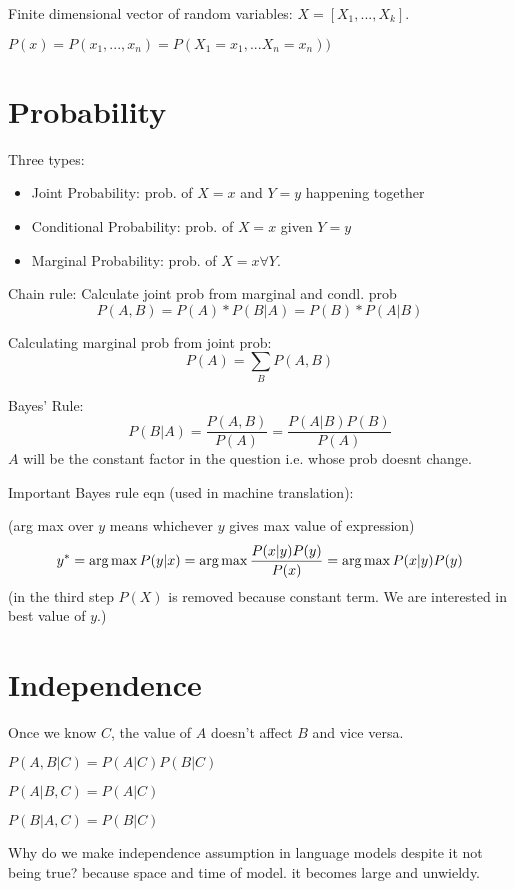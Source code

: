 \documentclass{article}
\begin{document}
\begin{definition}
Finite dimensional vector of random variables: 
$X = [X_{1},..., X_{k}]$.

$P(x) = P(x_{1},...,x_{n}) = P(X_{1} = x_{1},...X_{n} = x_{n}))$
\end{definition}
\section{Probability}
Three types:
\begin{itemize}
    \item Joint Probability: prob. of $X=x$ and $Y=y$ happening
    together
    \item Conditional Probability: prob. of $X=x$ given $Y=y$
    \item Marginal Probability: prob. of $X=x \forall Y$.
\end{itemize}

Chain rule: Calculate joint prob from marginal and condl. prob
\begin{equation}
    P(A,B) = P(A)*P(B|A) = P(B)*P(A|B)
\end{equation}

Calculating marginal prob from joint prob:
\begin{equation}
    P(A) = \sum_{B}P(A,B)
\end{equation}

Bayes' Rule: 
\begin{equation}
    P(B|A) = \frac{P(A,B)}{P(A)} = \frac{P(A|B)P(B)}{P(A)}
\end{equation}
$A$ will be the constant factor in the question i.e. whose prob doesnt
change.

Important Bayes rule eqn (used in machine translation):

(arg max over $y$ means whichever $y$ gives max value of expression)
\begin{equation}
    y^{*} = \arg \max P(y|x) \\
    = \arg \max \frac{P(x|y)P(y)}{P(x)} \\
    = \arg \max P(x|y)P(y)
\end{equation}
(in the third step $P(X)$ is removed because constant term. We are
interested in best value of $y$.)
\section{Independence}
 \begin{definition}
     Once we know $C$, the value of $A$ doesn't affect $B$ and 
     vice versa.

     $P(A,B|C) = P(A|C)P(B|C)$

     $P(A|B,C) = P(A|C)$

     $P(B|A,C) = P(B|C)$
 \end{definition}

Why do we make independence assumption in language models despite 
it not being true? because space and time of model. it becomes large
and unwieldy.
\end{document}
